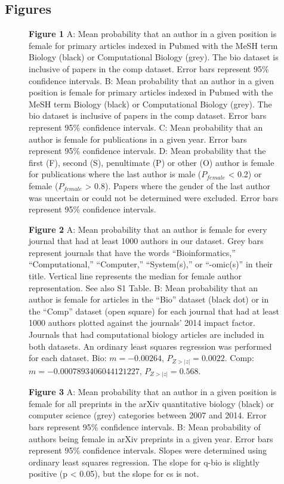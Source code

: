 \documentclass[10pt,letterpaper]{article}
\begin{document}
\begin{flushleft}
\section*{Figures}
\begin{figure}[!h]
  \caption{{\bf Figure 1}
  A: Mean probability that an author in a given position is female for primary articles indexed in Pubmed with the MeSH term Biology (black) or Computational Biology (grey). The bio dataset is inclusive of papers in the comp dataset. Error bars represent 95\% confidence intervals. B: Mean probability that an author in a given position is female for primary articles indexed in Pubmed with the MeSH term Biology (black) or Computational Biology (grey). The bio dataset is inclusive of papers in the comp dataset. Error bars represent 95\% confidence intervals. C: Mean probability that an author is female for publications in a given year. Error bars represent 95\% confidence intervals. D: Mean probability that the first (F), second (S), penultimate (P) or other (O) author is female for publications where the last author is male ($P_{female}$ < 0.2) or female ($P_{female}$ > 0.8). Papers where the gender of the last author was uncertain or could not be determined were excluded. Error bars represent 95\% confidence intervals.}
  \label{fig1}
\end{figure}

\begin{figure}[!h]
  \caption{{\bf Figure 2}
  A: Mean probability that an author is female for every journal that had at least 1000 authors in our dataset. Grey bars represent journals that have the words “Bioinformatics,” “Computational,” “Computer,” “System(s),” or “-omic(s)” in their title. Vertical line represents the median for female author representation. See also S1 Table. B: Mean probability that an author is female for articles in the “Bio” dataset (black dot) or in the “Comp” dataset (open square) for each journal that had at least 1000 authors plotted against the journals’ 2014 impact factor. Journals that had computational biology articles are included in both datasets. An ordinary least squares regression was performed for each dataset. Bio: $m = -0.00264$, $P_{Z>|z|} = 0.0022$. Comp: $m = -0.0007893406044121227$, $P_{Z>|z|} = 0.568$.}
  \label{fig2}
\end{figure}

\begin{figure}[!h]
  \caption{{\bf Figure 3}
  A: Mean probability that an author in a given position is female for all preprints in the arXiv quantitative biology (black) or computer science (grey) categories between 2007 and 2014. Error bars represent 95\% confidence intervals. B: Mean probability of authors being female in arXiv preprints in a given year. Error bars represent 95\% confidence intervals. Slopes were determined using ordinary least squares regression. The slope for q-bio is slightly positive (p < 0.05), but the slope for cs is not.}
  \label{fig3}
\end{figure}


\end{flushleft}
\end{document}
